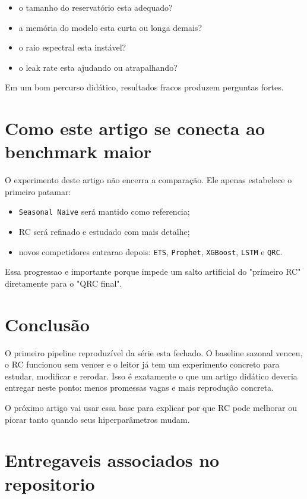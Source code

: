 \documentclass[12pt]{article}
\providecommand{\tightlist}{%
              \setlength{\itemsep}{0pt}\setlength{\parskip}{0pt}}
\begin{document}
\begin{itemize}
\tightlist
\item
  o tamanho do reservatório esta adequado?
\item
  a memória do modelo esta curta ou longa demais?
\item
  o raio espectral esta instável?
\item
  o leak rate esta ajudando ou atrapalhando?
\end{itemize}

Em um bom percurso didático, resultados fracos produzem perguntas fortes.

\section{Como este artigo se conecta ao benchmark maior}\label{9-como-este-artigo-se-conecta-ao-benchmark-maior}

O experimento deste artigo não encerra a comparação. Ele apenas estabelece o primeiro patamar:

\begin{itemize}
\tightlist
\item
  \texttt{Seasonal\ Naive} será mantido como referencia;
\item
  RC será refinado e estudado com mais detalhe;
\item
  novos competidores entrarao depois: \texttt{ETS}, \texttt{Prophet}, \texttt{XGBoost}, \texttt{LSTM} e \texttt{QRC}.
\end{itemize}

Essa progressao e importante porque impede um salto artificial do "primeiro RC" diretamente para o "QRC final".

\section{Conclusão}\label{10-conclusuxe3o}

O primeiro pipeline reproduzível da série esta fechado. O baseline sazonal venceu, o RC funcionou sem vencer e o leitor já tem um experimento concreto para estudar, modificar e rerodar. Isso é exatamente o que um artigo didático deveria entregar neste ponto: menos promessas vagas e mais reprodução concreta.

O próximo artigo vai usar essa base para explicar por que RC pode melhorar ou piorar tanto quando seus hiperparâmetros mudam.

\section*{Entregaveis associados no repositorio}\label{entregaveis-associados-no-repositorio}
\end{document}
